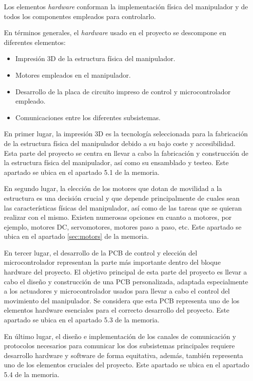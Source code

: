Los elementos \textit{hardware} conforman la implementación física del manipulador y de todos los componentes empleados para controlarlo.

En términos generales, el \textit{hardware} usado en el proyecto se descompone en diferentes elementos:
\begin{itemize}
    \item Impresión 3D de la estructura física del manipulador.
    \item Motores empleados en el manipulador.
    \item Desarrollo de la placa de circuito impreso de control y microcontrolador empleado.
    \item Comunicaciones entre los diferentes subsistemas.
\end{itemize}

En primer lugar, la impresión 3D es la tecnología seleccionada para la fabricación de la estructura física del manipulador debido a su bajo coste y accesibilidad. Esta parte del proyecto se centra en llevar a cabo la fabricación y construcción de la estructura física del manipulador, así como su ensamblado y testeo. Este apartado se ubica en el apartado 5.1 de la memoria.

En segundo lugar, la elección de los motores que dotan de movilidad a la estructura es una decisión crucial y que depende principalmente de cuales sean las características físicas del manipulador, así como de las tareas que se quieran realizar con el mismo. Existen numerosas opciones en cuanto a motores, por ejemplo, motores DC, servomotores, motores paso a paso, etc. Este apartado se ubica en el apartado \ref{sec:motors} de la memoria.

En tercer lugar, el desarrollo de la PCB de control y elección del microcontrolador representan la parte más importante dentro del bloque hardware del proyecto. El objetivo principal de esta parte del proyecto es llevar a cabo el diseño y construcción de una PCB personalizada, adaptada especialmente a los actuadores y microcontrolador usados para llevar a cabo el control del movimiento del manipulador. Se considera que esta PCB representa uno de los elementos hardware esenciales para el correcto desarrollo del proyecto. Este apartado se ubica en el apartado 5.3 de la memoria.

En último lugar, el diseño e implementación de los canales de comunicación y protocolos necesarios para comunicar los dos subsistemas principales requiere desarrollo hardware y software de forma equitativa, además, también representa uno de los elementos cruciales del proyecto. Este apartado se ubica en el apartado 5.4 de la memoria.




